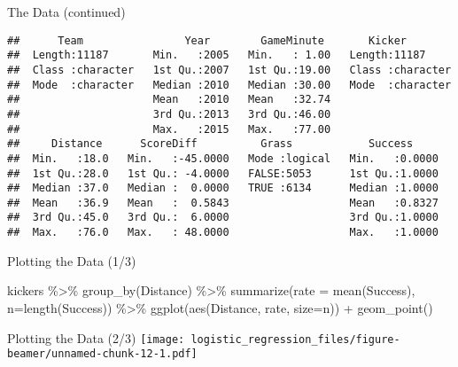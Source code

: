 \documentclass[
  ignorenonframetext,
]{beamer}
\newenvironment{Shaded}{\begin{snugshade}}{\end{snugshade}}
\newcommand{\AttributeTok}[1]{\textcolor[rgb]{0.77,0.63,0.00}{#1}}
\newcommand{\FunctionTok}[1]{\textcolor[rgb]{0.00,0.00,0.00}{#1}}
\newcommand{\NormalTok}[1]{#1}
\newcommand{\SpecialCharTok}[1]{\textcolor[rgb]{0.00,0.00,0.00}{#1}}
\begin{document}
\begin{frame}[fragile]{The Data (continued)}
\protect\hypertarget{the-data-continued}{}
\begin{verbatim}
##      Team                Year        GameMinute       Kicker         
##  Length:11187       Min.   :2005   Min.   : 1.00   Length:11187      
##  Class :character   1st Qu.:2007   1st Qu.:19.00   Class :character  
##  Mode  :character   Median :2010   Median :30.00   Mode  :character  
##                     Mean   :2010   Mean   :32.74                     
##                     3rd Qu.:2013   3rd Qu.:46.00                     
##                     Max.   :2015   Max.   :77.00                     
##     Distance      ScoreDiff          Grass            Success      
##  Min.   :18.0   Min.   :-45.0000   Mode :logical   Min.   :0.0000  
##  1st Qu.:28.0   1st Qu.: -4.0000   FALSE:5053      1st Qu.:1.0000  
##  Median :37.0   Median :  0.0000   TRUE :6134      Median :1.0000  
##  Mean   :36.9   Mean   :  0.5843                   Mean   :0.8327  
##  3rd Qu.:45.0   3rd Qu.:  6.0000                   3rd Qu.:1.0000  
##  Max.   :76.0   Max.   : 48.0000                   Max.   :1.0000
\end{verbatim}
\end{frame}

\begin{frame}[fragile]{Plotting the Data (1/3)}
\protect\hypertarget{plotting-the-data-13}{}
\begin{Shaded}
\begin{Highlighting}[]
\NormalTok{kickers }\SpecialCharTok{\%\textgreater{}\%} \FunctionTok{group\_by}\NormalTok{(Distance) }\SpecialCharTok{\%\textgreater{}\%} 
  \FunctionTok{summarize}\NormalTok{(}\AttributeTok{rate =} \FunctionTok{mean}\NormalTok{(Success), }
            \AttributeTok{n=}\FunctionTok{length}\NormalTok{(Success)) }\SpecialCharTok{\%\textgreater{}\%} 
  \FunctionTok{ggplot}\NormalTok{(}\FunctionTok{aes}\NormalTok{(Distance, rate, }\AttributeTok{size=}\NormalTok{n)) }\SpecialCharTok{+} 
  \FunctionTok{geom\_point}\NormalTok{()}
\end{Highlighting}
\end{Shaded}
\end{frame}

\begin{frame}{Plotting the Data (2/3)}
\protect\hypertarget{plotting-the-data-23}{}
\texttt{[image: logistic\_regression\_files/figure-beamer/unnamed-chunk-12-1.pdf]}
\end{frame}
\end{document}
